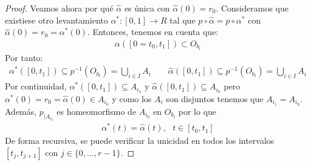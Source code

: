 \begin{lema}
\begin{proof}
       Veamos ahora por qué $\hat{\alpha}$ es única con $\hat{\alpha}(0)=r_0$. Consideramos que existiese otro levantamiento $\alpha^*:[0,1]\to R$ tal que $p\circ \hat{\alpha} = p\circ \alpha^*$ con $\hat{\alpha}(0) = r_0 = \alpha^*(0)$. Entonces, tenemos en cuenta que:
       \begin{gather*}
            \alpha([0=t_0,t_1]) \subset O_{b_l}
       \end{gather*}
       Por tanto:
       \begin{gather*}
            \alpha^*([0,t_1]) \subseteq p^{-1}(O_{b_l}) = \bigcup\limits_{i\in I} A_i\qquad 
            \hat{\alpha}([0,t_1]) \subseteq p^{-1}(O_{b_l}) = \bigcup\limits_{i\in I} A_i
       \end{gather*}
       Por continuidad, $\alpha^*([0,t_1])\subseteq A_{i_1}$ y $\hat{\alpha}([0,t_1])\subseteq A_{i_0}$ pero $\alpha^*(0)=r_0=\hat{\alpha}(0)\in A_{i_0}$ y como los $A_i$ son disjuntos tenemos que $A_{i_1} = A_{i_0}$. Además, $p_{|A_{i_0}}$ es homeomorfismo de $A_{i_0}$ en $O_{b_l}$ por lo que 
       \begin{gather*}
            \alpha^*(t) = \hat{\alpha}(t),\ \ \ t\in [t_0,t_1]
       \end{gather*}
       De forma recursiva, se puede verificar la unicidad en todos los intervalos $[t_j, t_{j+1}]$ con $j\in \{0,\dots,r-1\}$.
    \end{proof}
\end{lema}

